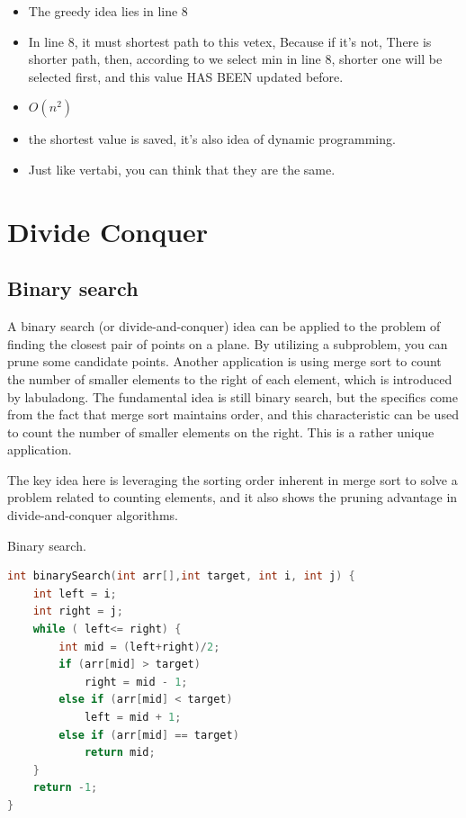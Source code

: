 \documentclass[a4paper,11pt,twoside]{book}
\begin{document}
\begin{itemize}
\item The greedy idea lies in line 8
\item In line 8, it must shortest path to this vetex,  Because if it's not, There is shorter path, then, according to we select min in line 8, shorter one will be selected first, and this value HAS BEEN updated before. 
\item $O(n^{2})$
\item the shortest value is saved, it's also idea of dynamic programming.
\item Just like vertabi, you can think that they are the same. 
\end{itemize}


\section{Divide Conquer}
\subsection{Binary search}

	\par A binary search (or divide-and-conquer) idea can be applied to the problem of finding the closest pair of points on a plane. By utilizing a subproblem, you can prune some candidate points. Another application is using merge sort to count the number of smaller elements to the right of each element, which is introduced by labuladong. The fundamental idea is still binary search, but the specifics come from the fact that merge sort maintains order, and this characteristic can be used to count the number of smaller elements on the right. This is a rather unique application.
	
	\par The key idea here is leveraging the sorting order inherent in merge sort to solve a problem related to counting elements, and it also shows the pruning advantage in divide-and-conquer algorithms.
	
	\par Binary search.

\begin{lstlisting}[frame=single, language=c++]
int binarySearch(int arr[],int target, int i, int j) {
	int left = i;
	int right = j;
	while ( left<= right) {
		int mid = (left+right)/2;
		if (arr[mid] > target)
			right = mid - 1;
		else if (arr[mid] < target)
			left = mid + 1;
		else if (arr[mid] == target)
			return mid;
	}
	return -1;
} 
\end{lstlisting}
\end{document}
